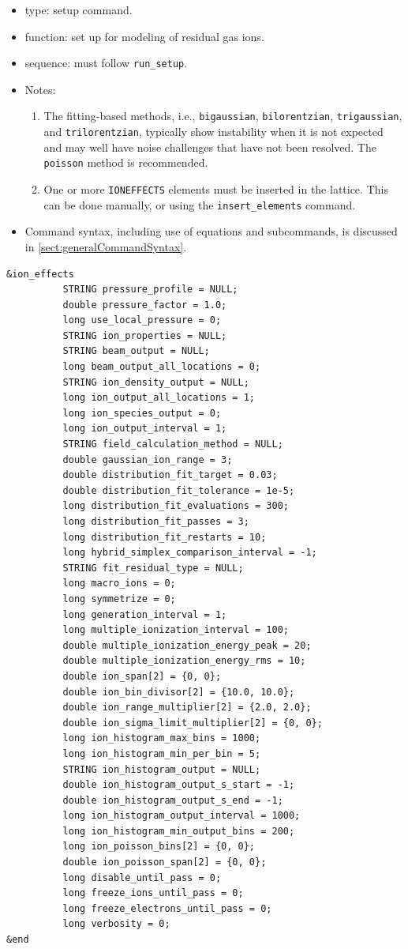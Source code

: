 \documentclass[11pt]{article}
\begin{document}
\begin{itemize}
\item type: setup command.
\item function: set up for modeling of residual gas ions.
\item sequence: must follow \verb|run_setup|.
\item Notes:
  \begin{enumerate}
  \item The fitting-based methods, i.e., \verb|bigaussian|, \verb|bilorentzian|, 
    \verb|trigaussian|, and \verb|trilorentzian|, typically show instability when it is not expected and
    may well have noise challenges that have not been resolved.  The \verb|poisson| method is recommended.
  \item One or more \verb|IONEFFECTS| elements must be inserted in the lattice. This can be
    done manually, or using the \verb|insert_elements| command.
  \end{enumerate}
\item Command syntax, including use of equations and subcommands, is discussed in \ref{sect:generalCommandSyntax}.
\end{itemize}

\begin{verbatim}
&ion_effects
          STRING pressure_profile = NULL;
          double pressure_factor = 1.0;
          long use_local_pressure = 0;
          STRING ion_properties = NULL;
          STRING beam_output = NULL;
          long beam_output_all_locations = 0;
          STRING ion_density_output = NULL;
          long ion_output_all_locations = 1;
          long ion_species_output = 0;
          long ion_output_interval = 1;	
          STRING field_calculation_method = NULL;
          double gaussian_ion_range = 3;
          double distribution_fit_target = 0.03;
          double distribution_fit_tolerance = 1e-5;
          long distribution_fit_evaluations = 300;
          long distribution_fit_passes = 3;
          long distribution_fit_restarts = 10;
          long hybrid_simplex_comparison_interval = -1;
          STRING fit_residual_type = NULL;
          long macro_ions = 0;
          long symmetrize = 0;
          long generation_interval = 1;
          long multiple_ionization_interval = 100;
          double multiple_ionization_energy_peak = 20;
          double multiple_ionization_energy_rms = 10;
          double ion_span[2] = {0, 0};
          double ion_bin_divisor[2] = {10.0, 10.0};
          double ion_range_multiplier[2] = {2.0, 2.0};
          double ion_sigma_limit_multiplier[2] = {0, 0};
          long ion_histogram_max_bins = 1000;
          long ion_histogram_min_per_bin = 5;
          STRING ion_histogram_output = NULL;
          double ion_histogram_output_s_start = -1;
          double ion_histogram_output_s_end = -1;
          long ion_histogram_output_interval = 1000;
          long ion_histogram_min_output_bins = 200;
          long ion_poisson_bins[2] = {0, 0};
          double ion_poisson_span[2] = {0, 0};
          long disable_until_pass = 0;
          long freeze_ions_until_pass = 0;
          long freeze_electrons_until_pass = 0;
          long verbosity = 0;
&end
\end{verbatim}
\end{document}
